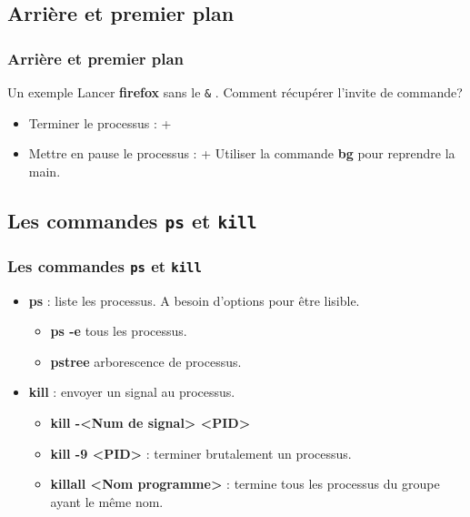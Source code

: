 \documentclass{beamer}
\begin{document}
    \subsection{Arrière et premier plan}
    \begin{frame}
        \frametitle{Arrière et premier plan}
        \begin{block}{Un exemple}
        Lancer {\bf firefox} sans le \texttt{\&} .\newline
        Comment récupérer l'invite de commande?
        \end{block}
        \begin{itemize}
            \item Terminer le processus : \Ctrl + 
            \item Mettre en pause le processus : \Ctrl + 
                \newline Utiliser la commande {\bf bg} pour reprendre la main.
        \end{itemize}
    \end{frame}

    \subsection{Les commandes \texttt{ps} et \texttt{kill}}
    \begin{frame}
        \frametitle{Les commandes \texttt{ps} et \texttt{kill}}
        \begin{itemize}
            \item {\bf ps} : liste les processus. A besoin d'options pour être lisible.
                \begin{itemize}
                    \item {\bf ps -e} tous les processus.
                    \item {\bf pstree} arborescence de processus.
                \end{itemize}
            \item {\bf kill} : envoyer un signal au processus.
                \begin{itemize}
                    \item {\bf kill -<Num de signal> <PID>}
                    \item {\bf kill -9 <PID>} : terminer brutalement un processus.
                    \item {\bf killall <Nom programme>} : termine tous les processus du groupe ayant le même nom.
                \end{itemize}
        \end{itemize}
    \end{frame}
\end{document}
